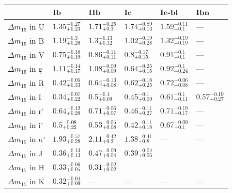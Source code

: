 \begin{tabular}{llllll}
\toprule
{} &                      Ib &                     IIb &                      Ic &                   Ic-bl &                     Ibn \\
\midrule
${\Delta m}_{15}$ in U   &  $1.35^{-0.27}_{+0.23}$ &   $1.71^{-0.25}_{+0.3}$ &  $1.74^{-0.89}_{+0.13}$ &   $1.59^{-0.11}_{+0.1}$ &                     --- \\
${\Delta m}_{15}$ in B   &   $1.19^{-0.3}_{+0.26}$ &   $1.3^{-0.13}_{+0.12}$ &  $1.02^{-0.19}_{+0.28}$ &  $1.32^{-0.19}_{+0.19}$ &                     --- \\
${\Delta m}_{15}$ in V   &  $0.75^{-0.18}_{+0.19}$ &  $0.86^{-0.11}_{+0.11}$ &   $0.8^{-0.17}_{+0.15}$ &    $0.91^{-0.1}_{+0.1}$ &                     --- \\
${\Delta m}_{15}$ in g   &  $1.11^{-0.14}_{+0.17}$ &  $1.08^{-0.09}_{+0.09}$ &  $0.64^{-0.25}_{+0.15}$ &   $0.92^{-0.1}_{+0.24}$ &                     --- \\
${\Delta m}_{15}$ in R   &  $0.42^{-0.05}_{+0.33}$ &  $0.64^{-0.13}_{+0.08}$ &  $0.62^{-0.18}_{+0.25}$ &  $0.72^{-0.06}_{+0.08}$ &                     --- \\
${\Delta m}_{15}$ in I   &  $0.34^{-0.07}_{+0.22}$ &    $0.5^{-0.1}_{+0.09}$ &   $0.45^{-0.1}_{+0.09}$ &   $0.61^{-0.1}_{+0.11}$ &  $0.57^{-0.19}_{+0.27}$ \\
${\Delta m}_{15}$ in r'  &  $0.64^{-0.12}_{+0.28}$ &  $0.71^{-0.06}_{+0.07}$ &  $0.46^{-0.11}_{+0.27}$ &  $0.71^{-0.19}_{+0.17}$ &                     --- \\
${\Delta m}_{15}$ in i'  &   $0.5^{-0.08}_{+0.22}$ &  $0.53^{-0.05}_{+0.08}$ &  $0.42^{-0.11}_{+0.18}$ &   $0.67^{-0.09}_{+0.1}$ &                     --- \\
${\Delta m}_{15}$ in u'  &  $1.93^{-0.57}_{+0.28}$ &   $2.11^{-0.42}_{+0.2}$ &   $1.38^{-0.41}_{+0.8}$ &                     --- &                     --- \\
${\Delta m}_{15}$ in J   &  $0.36^{-0.13}_{+0.13}$ &  $0.47^{-0.09}_{+0.04}$ &  $0.39^{-0.04}_{+0.06}$ &                     --- &                     --- \\
${\Delta m}_{15}$ in H   &  $0.33^{-0.06}_{+0.05}$ &  $0.31^{-0.02}_{+0.02}$ &                     --- &                     --- &                     --- \\
${\Delta m}_{15}$ in K   &  $0.32^{-0.04}_{+0.09}$ &                     --- &                     --- &                     --- &                     --- \\

\end{tabular}
